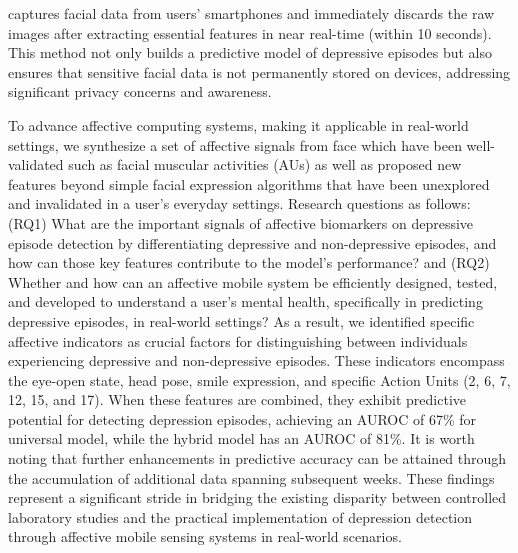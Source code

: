 captures facial data from users' smartphones and immediately discards the raw images after extracting essential features in near real-time (within 10 seconds). This method not only builds a predictive model of depressive episodes but also ensures that sensitive facial data is not permanently stored on devices, addressing significant privacy concerns and awareness.


To advance affective computing systems, making it applicable in real-world settings, we synthesize a set of affective signals from face which have been well-validated such as facial muscular activities (AUs) as well as proposed new features beyond simple facial expression algorithms that have been unexplored and invalidated in a user's everyday settings. Research questions as follows: (RQ1) What are the important signals of affective biomarkers on depressive episode detection by differentiating depressive and non-depressive episodes, and how can those key features contribute to the model's performance? and (RQ2) Whether and how can an affective mobile system be efficiently designed, tested, and developed to understand a user's mental health, specifically in predicting depressive episodes, in real-world settings? As a result, we identified specific affective indicators as crucial factors for distinguishing between individuals experiencing depressive and non-depressive episodes. These indicators encompass the eye-open state, head pose, smile expression, and specific Action Units (2, 6, 7, 12, 15, and 17). When these features are combined, they exhibit predictive potential for detecting depression episodes, achieving an AUROC of 67\% for universal model, while the hybrid model has an AUROC of 81\%. It is worth noting that further enhancements in predictive accuracy can be attained through the accumulation of additional data spanning subsequent weeks. These findings represent a significant stride in bridging the existing disparity between controlled laboratory studies and the practical implementation of depression detection through affective mobile sensing systems in real-world scenarios.

